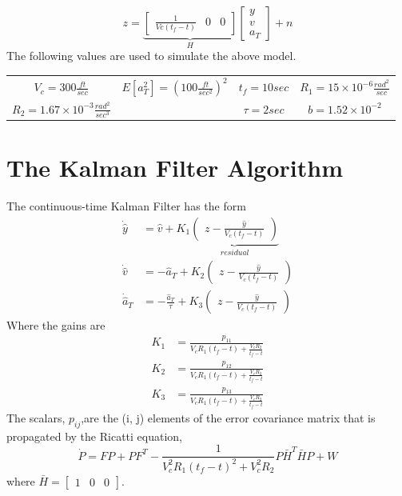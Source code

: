 \documentclass{article}
\begin{document}
\begin{equation}\label{SS_measurement}
    z = 
    \underbrace{
        \begin{bmatrix}
            \frac{1}{Vc(t_f -t)} & 0 & 0
        \end{bmatrix}
    }_{H}
    \begin{bmatrix}
        y \\
        v \\
        a_T
    \end{bmatrix} + n
\end{equation}
The following values are used to simulate the above model.
\begin{center}
    \begin{tabular}{c c c c}
        $V_c = 300 \frac{ft}{sec}$ & $E[a_T^2] = (100 \frac{ft}{sec^2})^2$ & $t_f = 10 sec$ & $R_1 = 15 \times 10^{-6} \frac{rad^2}{sec}$ \\
        $R_2 = 1.67 \times 10^{-3} \frac{rad^2}{sec^3}$ & & $\tau = 2 sec$ & $b = 1.52 \times 10^{-2}$
    \end{tabular}
\end{center}
\section{The Kalman Filter Algorithm}
The continuous-time Kalman Filter has the form
\begin{equation}
    \begin{split}
        \dot{\hat y} & = \hat v + K_1 \underbrace{\begin{pmatrix}z - \frac{\hat y}{V_c(t_f - t)}\end{pmatrix}}_{residual} \\
        \dot{\hat v} & = -\hat{a}_T + K_2 \begin{pmatrix}z - \frac{\hat y}{V_c(t_f - t)}\end{pmatrix} \\
        \dot{\hat{a}}_T & = - \frac{\hat{a}_T}{\tau} + K_3 \begin{pmatrix}z - \frac{\hat y}{V_c(t_f - t)} \end{pmatrix}
    \end{split}
\end{equation}
Where the gains are
\begin{equation}
    \begin{split}
        K_1 & = \frac{p_{11}}{V_c R_1 (t_f - t) + \frac{V_c R_2}{t_f - t}} \\
        K_2 & = \frac{p_{12}}{V_c R_1 (t_f - t) + \frac{V_c R_2}{t_f - t}} \\
        K_3 & = \frac{p_{13}}{V_c R_1 (t_f - t) + \frac{V_c R_2}{t_f - t}} 
    \end{split}
\end{equation}
The scalars, $p_{ij}$,are the (i, j) elements of the error covariance matrix that is propagated by the Ricatti equation,
\begin{equation}
    \dot P = F P + P F^T - \frac{1}{V_c^2 R_1 (t_f - t)^2 + V_c^2 R_2}P \bar{H}^T \bar{H} P + W
\end{equation}
where $\bar{H} = \begin{bmatrix}
    1 & 0 & 0
\end{bmatrix}$.
\end{document}
